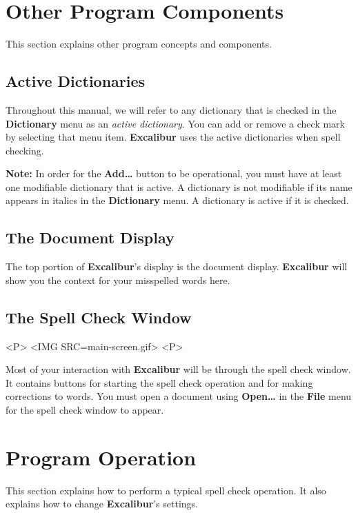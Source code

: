 ﻿\documentclass[11pt,titlepage]{article}
\newcommand{\ex}{\textbf{Excalibur}}
\begin{document}
\section{Other Program Components}

This section explains other program concepts and components.

\subsection{Active Dictionaries}
\label{sec:act-dict}

Throughout this manual, we will refer to any dictionary that is
checked in the \textbf{Dictionary} menu as an \emph{active
  dictionary}.  You can add or remove a check mark by selecting that
menu item. \ex{} uses the active dictionaries when spell checking.

\textbf{Note:} In order for the \textbf{Add\ldots} button to be
operational, you must have at least one modifiable dictionary that is
active.  A dictionary is not modifiable if its name appears in italics
in the \textbf{Dictionary} menu.  A dictionary is active if it is
checked.

\subsection{The Document Display}

The top portion of \ex's display is the document display. \ex{} will
show you the context for your misspelled words here.

\subsection{The Spell Check Window}

\begin{rawhtml}
<P>
<IMG SRC=main-screen.gif>
<P>
\end{rawhtml}

Most of your interaction with \ex{} will be through the spell check
window. It contains buttons for starting the spell check operation and
for making corrections to words. You must open a document using
\textbf{Open\ldots} in the \textbf{File} menu for the spell check
window to appear.

\section{Program Operation}

This section explains how to perform a typical spell check operation.
It also explains how to change \ex's settings.
\end{document}
